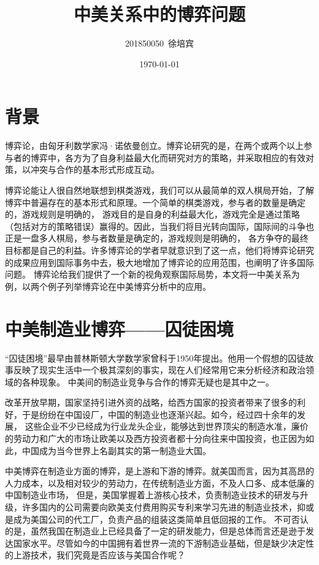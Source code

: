 \documentclass[UTF8]{article}
\title{中美关系中的博弈问题}
\author{201850050\ 徐培宾}
\date{\today}
\begin{document}
    \maketitle
    \section{背景}
    博弈论，由匈牙利数学家冯·诺依曼创立。博弈论研究的是，在两个或两个以上参与者的博弈中，各方为了自身利益最大化而研究对方的策略，并采取相应的有效对策，以冲突与合作的基本形式形成互动。

    博弈论能让人很自然地联想到棋类游戏，我们可以从最简单的双人棋局开始，了解博弈中普遍存在的基本形式和原理。一个简单的棋类游戏，参与者的数量是确定的，游戏规则是明确的，
    游戏目的是自身的利益最大化，游戏完全是通过策略（包括对方的策略错误）赢得的。因此，当我们将目光转向国际，国际间的斗争也正是一盘多人棋局，参与者数量是确定的，游戏规则是明确的，
    各方争夺的最终目标都是自己的利益。许多博弈论的学者早就意识到了这一点，他们将博弈论研究的成果应用到国际事务中去，极大地增加了博弈论的应用范围，也阐明了许多国际问题。
    博弈论给我们提供了一个新的视角观察国际局势，本文将一中美关系为例，以两个例子列举博弈论在中美博弈分析中的应用。

    \section{中美制造业博弈——囚徒困境}
    “囚徒困境”最早由普林斯顿大学数学家曾科于1950年提出。他用一个假想的囚徒故事反映了现实生活中一个极其深刻的事实，现在人们经常用它来分析经济和政治领域的各种现象。
    中美间的制造业竞争与合作的博弈无疑也是其中之一。

    改革开放早期，国家坚持引进外资的战略，给西方国家的投资者带来了很多的利好，于是纷纷在中国设厂，中国的制造业也逐渐兴起。如今，经过四十余年的发展，
    这些企业不少已经成为行业龙头企业，能够达到世界顶尖的制造水准，廉价的劳动力和广大的市场让欧美以及西方投资者都十分向往来中国投资，也正因为如此，中国成为当今世界上名副其实的第一制造业大国。

    中美博弈在制造业方面的博弈，是上游和下游的博弈。就美国而言，因为其高昂的人力成本，以及相对较少的劳动力，在传统制造业方面，不及人口多、成本低廉的中国制造业市场，
    但是，美国掌握着上游核心技术，负责制造业技术的研发与升级，许多国内的公司需要向欧美支付费用购买专利来学习先进的制造业技术，抑或是成为美国公司的代工厂，负责产品的组装这类简单且低回报的工作。
    不可否认的是，虽然我国在制造业上已经具备了一定的研发能力，但是总体而言还是逊于发达国家水平。尽管如今的中国拥有着世界一流的下游制造业基础，但是缺少决定性的上游技术，我们究竟是否应该与美国合作呢？
\end{document}
